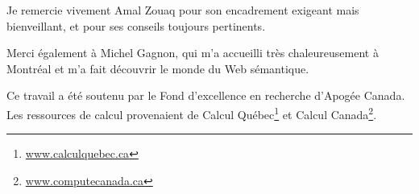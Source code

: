 %
%


Je remercie vivement Amal Zouaq 
pour son encadrement exigeant mais bienveillant, et pour ses conseils toujours pertinents.

Merci également à Michel Gagnon, qui m'a accueilli très chaleureusement à Montréal et m'a fait découvrir le monde du Web sémantique.


Ce travail a été soutenu par le Fond d'excellence en recherche d'Apogée Canada. Les ressources de calcul provenaient de Calcul Québec\footnote{\href{www.calculquebec.ca}{www.calculquebec.ca}} et Calcul Canada\footnote{\href{www.computecanada.ca}{www.computecanada.ca}}.
